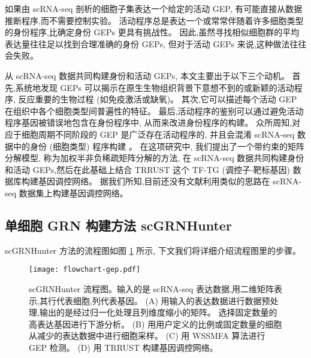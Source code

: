 如果由 scRNA-seq 剖析的细胞子集表达一个给定的活动 GEP,
有可能直接从数据推断程序,而不需要控制实验。
活动程序总是表达一个或常常伴随着许多细胞类型的身份程序,比确定身份 GEPs 更具有挑战性。
因此,虽然寻找相似细胞群的平均表达量往往足以找到合理准确的身份 GEPs,
但对于活动 GEPs 来说,这种做法往往会失败。

从 scRNA-seq 数据共同构建身份和活动 GEPs, 本文主要出于以下三个动机。
首先,系统地发现 GEPs 可以揭示在原生生物组织背景下意想不到的或新颖的活动程序,
反应重要的生物过程 (如免疫激活或缺氧)。
其次,它可以描述每个活动 GEP 在组织中各个细胞类型间普遍性的特征。
最后,活动程序的鉴别可以通过避免活动程序基因被错误地包含在身份程序中, 从而来改进身份程序的构建。
众所周知,对应于细胞周期不同阶段的 GEP 是广泛存在活动程序的,
并且会混淆 scRNA-seq 数据中的身份 (细胞类型) 程序构建 \cite{scialdone2015computational,chen2017controlling}。
在这项研究中, 我们提出了一个带约束的矩阵分解模型, 称为加权半非负稀疏矩阵分解的方法,
在 scRNA-seq 数据共同构建身份和活动 GEPs,然后在此基础上结合 TRRUST 这个 TF-TG (调控子-靶标基因) 数据库构建基因调控网络。
据我们所知,目前还没有文献利用类似的思路在 scRNA-seq 数据集上构建基因调控网络。

\subsection{单细胞 GRN 构建方法 scGRNHunter}

scGRNHunter 方法的流程图如图 \ref{fig:gep-flowchart} 所示, 下文我们将详细介绍流程图里的步骤。
\begin{figure}[!htbp]
    \centering
    \texttt{[image: flowchart-gep.pdf]}
    \caption{
        scGRNHunter 流程图。输入的是 scRNA-seq 表达数据,用二维矩阵表示,其行代表细胞,列代表基因。
        (A) 用输入的表达数据进行数据预处理,输出的是经过归一化处理且列维度缩小的矩阵。
        选择固定数量的高表达基因进行下游分析。
        (B) 用用户定义的比例或固定数量的细胞从减少的表达数据中进行细胞采样。
        (C) 用 WSSMFA 算法进行 GEP 检测。
        (D) 用 TRRUST 构建基因调控网络。
    }
    \label{fig:gep-flowchart}
\end{figure}


